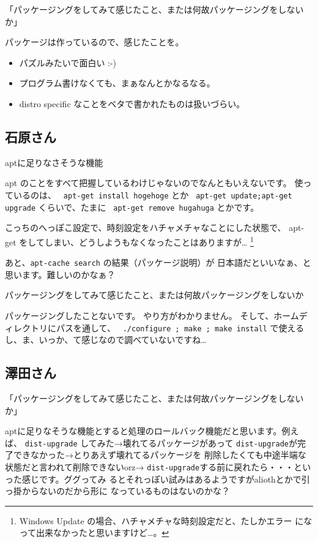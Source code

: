 \documentclass[cjk,dvipdfmx]{beamer}
\begin{document}
\begin{frame}{「パッケージングをしてみて感じたこと、または何故パッケージングをしないか」}

 パッケージは作っているので、感じたことを。

 \begin{itemize}
 \item パズルみたいで面白い :-)
 \item プログラム書けなくても、まぁなんとかなるなる。
 \item distro specific なことをベタで書かれたものは扱いづらい。
 \end{itemize}
\end{frame}

\subsection{石原さん}
\begin{frame}
 {aptに足りなさそうな機能}

 apt のことをすべて把握しているわけじゃないのでなんともいえないです。
 使っているのは、
 \texttt{ apt-get install hogehoge}
 とか
 \texttt{ apt-get update;apt-get upgrade}
 くらいで、たまに
 \texttt{ apt-get remove hugahuga}
 とかです。

 こっちのへっぽこ設定で、時刻設定をハチャメチャなことにした状態で、
 apt-get をしてしまい、どうしようもなくなったことはありますが…
 \footnote{Windows Update の場合、ハチャメチャな時刻設定だと、たしかエラー
 になって出来なかったと思いますけど…。}

 あと、\texttt{apt-cache search} の結果（パッケージ説明）が
 日本語だといいなぁ、と思います。難しいのかなぁ？
\end{frame}
\begin{frame}{パッケージングをしてみて感じたこと、または何故パッケージングをしないか}

 パッケージングしたことないです。
 やり方がわかりません。
 そして、ホームディレクトリにパスを通して、
 \texttt{ ./configure ; make ; make install}
 で使えるし、ま、いっか、て感じなので調べていないですね…
\end{frame}

\subsection{澤田さん}

\begin{frame}{「パッケージングをしてみて感じたこと、または何故パッケージングをしないか」}

aptに足りなそうな機能とすると処理のロールバック機能だと思います。例えば、
\texttt{dist-upgrade} してみた→壊れてるパッケージがあって
\texttt{dist-upgrade}が完了できなかった→とりあえず壊れてるパッケージを
削除したくても中途半端な状態だと言われて削除できないorz→
\texttt{dist-upgrade}する前に戻れたら・・・といった感じです。ググってみ
るとそれっぽい試みはあるようですがaliothとかで引っ掛からないのだから形に
なっているものはないのかな？

\end{frame}
\end{document}
